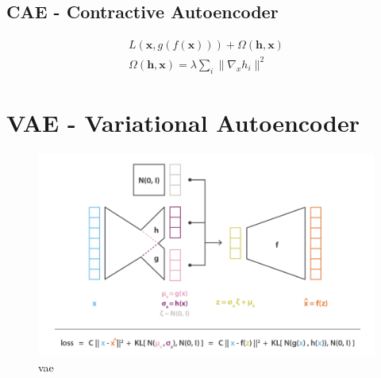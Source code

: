 \subsection{CAE - Contractive Autoencoder}
\begin{equation}
    \begin{split}
        L(\mathbf{x}, g(f(\mathbf{x}))) + \Omega(\mathbf{h}, \mathbf{x}) \\
        \Omega(\mathbf{h}, \mathbf{x}) = \lambda \sum_i \| \nabla_x h_i \|^2
    \end{split}
\end{equation}

\section{VAE - Variational Autoencoder}
\begin{figure}[H]
    \centering
    \includegraphics[width=12cm]{images/vae.png}
    \caption{vae}
    \label{fig:VAE}
\end{figure}